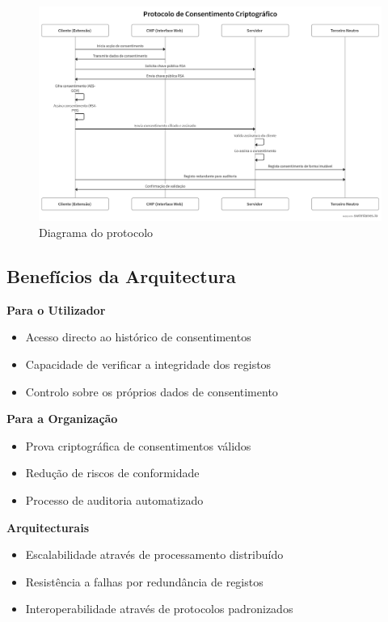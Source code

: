 \begin{figure}[h]
\begin{center}
\includegraphics[width=1.0\textwidth]{images/swimlanes.png}
\end{center}
\caption{Diagrama do protocolo}
\label{fig:swimlane}
\end{figure}

\subsection{Benefícios da Arquitectura}

\textbf{Para o Utilizador}
\begin{itemize}
    \item Acesso directo ao histórico de consentimentos
    \item Capacidade de verificar a integridade dos registos
    \item Controlo sobre os próprios dados de consentimento
\end{itemize}

\textbf{Para a Organização}
\begin{itemize}
    \item Prova criptográfica de consentimentos válidos
    \item Redução de riscos de conformidade
    \item Processo de auditoria automatizado
\end{itemize}

\textbf{Arquitecturais}
\begin{itemize}
    \item Escalabilidade através de processamento distribuído
    \item Resistência a falhas por redundância de registos
    \item Interoperabilidade através de protocolos padronizados
\end{itemize}

